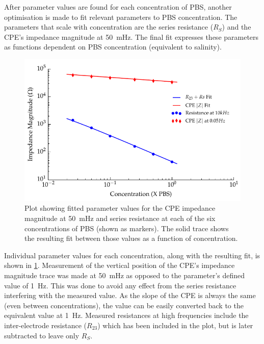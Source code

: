       After parameter values are found for each concentration of PBS, another optimisation is made to fit relevant parameters to PBS concentration.
      The parameters that scale with concentration are the series resistance ($R_{S}$) and the CPE's impedance magnitude at \SI{50}{\milli\hertz}.
      The final fit expresses these parameters as functions dependent on PBS concentration (equivalent to salinity).
      \begin{figure}
        \centering
        \includegraphics{content/pt2/08-InterfaceParameters/graphics/scalingFactors_Displacement_Thesis}
        \caption{\label{fig:pt2-scalingFactors_Displacement_Thesis}Plot showing fitted parameter values for the CPE impedance magnitude at \SI{50}{\milli\hertz} and series resistance at each of the six concentrations of PBS (shown as markers). The solid trace shows the resulting fit between those values as a function of concentration.}
      \end{figure}
      Individual parameter values for each concentration, along with the resulting fit, is shown in \cref{fig:pt2-scalingFactors_Displacement_Thesis}.
      Measurement of the vertical position of the CPE's impedance magnitude trace was made at \SI{50}{\milli\hertz} as opposed to the parameter's defined value of \SI{1}{\hertz}.
      This was done to avoid any effect from the series resistance interfering with the measured value.
      As the slope of the CPE is always the same (even between concentrations), the value can be easily converted back to the equivalent value at \SI{1}{\hertz}.
      Measured resistances at high frequencies include the inter-electrode resistance ($R_{23}$) which has been included in the plot, but is later subtracted to leave only $R_{S}$.
